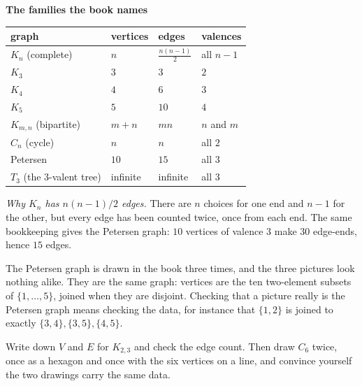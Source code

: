 \documentclass[10pt]{article}
\begin{document}
{\begin{minipage}[t]{744pt}
\begin{minipage}[t]{330pt}
{\sffamily\bfseries\color{big} The families the book names}\par\vspace{2pt}
\centering
\begin{tabular}{@{}llll@{}}
\toprule
graph & vertices & edges & valences\\
\midrule
$K_n$ (complete) & $n$ & $\tfrac{n(n-1)}{2}$ & all $n-1$\\
$K_3$ & $3$ & $3$ & $2$\\
$K_4$ & $4$ & $6$ & $3$\\
$K_5$ & $5$ & $10$ & $4$\\
$K_{m,n}$ (bipartite) & $m+n$ & $mn$ & $n$ and $m$\\
$C_n$ (cycle) & $n$ & $n$ & all $2$\\
Petersen & $10$ & $15$ & all $3$\\
$T_3$ (the $3$-valent tree) & infinite & infinite & all $3$\\
\bottomrule
\end{tabular}\par\vspace{4pt}
\raggedright
\begin{why}
\emph{Why $K_n$ has $n(n-1)/2$ edges.} There are $n$ choices for one end and $n-1$ for the other, but every edge has been counted twice, once from each end. The same bookkeeping gives the Petersen graph: $10$ vertices of valence $3$ make $30$ edge-ends, hence $15$ edges.
\end{why}
\begin{pitfall}
The Petersen graph is drawn in the book three times, and the three pictures look nothing alike. They are the same graph: vertices are the ten two-element subsets of $\{1,\dots,5\}$, joined when they are disjoint. Checking that a picture really is the Petersen graph means checking the data, for instance that $\{1,2\}$ is joined to exactly $\{3,4\},\{3,5\},\{4,5\}$.
\end{pitfall}
\begin{tryit}
Write down $V$ and $E$ for $K_{2,3}$ and check the edge count. Then draw $C_6$ twice, once as a hexagon and once with the six vertices on a line, and convince yourself the two drawings carry the same data.
\end{tryit}
\end{minipage}
\end{minipage}
}
\end{document}
